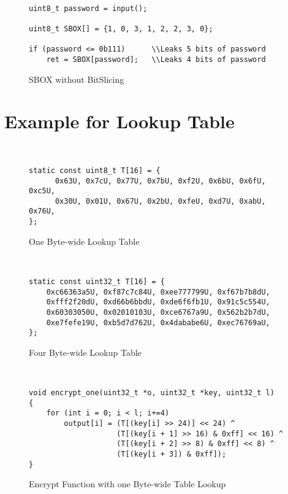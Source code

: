 ~

\begin{figure}[h!]
    \centering
    \begin{lstlisting}[xleftmargin=.02\textwidth,xrightmargin=.01\textwidth]
uint8_t password = input();

uint8_t SBOX[] = {1, 0, 3, 1, 2, 2, 3, 0};

if (password <= 0b111)      \\Leaks 5 bits of password
    ret = SBOX[password];   \\Leaks 4 bits of password
      \end{lstlisting}
    \caption{SBOX without BitSlicing}
    \label{fig:SBOX_da}
\end{figure}

\newpage

\section{Example for Lookup Table}
~
\begin{figure}[h!]
    \centering
    \begin{lstlisting}[xleftmargin=.02\textwidth,xrightmargin=.01\textwidth]
static const uint8_t T[16] = {
      0x63U, 0x7cU, 0x77U, 0x7bU, 0xf2U, 0x6bU, 0x6fU, 0xc5U,
      0x30U, 0x01U, 0x67U, 0x2bU, 0xfeU, 0xd7U, 0xabU, 0x76U,
};
      \end{lstlisting}
    \caption{One Byte-wide Lookup Table}
    \label{fig:one_byte_table}
\end{figure}
~
\begin{figure}[h!]
    \centering
    \begin{lstlisting}[xleftmargin=.02\textwidth,xrightmargin=.01\textwidth]
static const uint32_t T[16] = {
    0xc66363a5U, 0xf87c7c84U, 0xee777799U, 0xf67b7b8dU,
    0xfff2f20dU, 0xd66b6bbdU, 0xde6f6fb1U, 0x91c5c554U,
    0x60303050U, 0x02010103U, 0xce6767a9U, 0x562b2b7dU,
    0xe7fefe19U, 0xb5d7d762U, 0x4dababe6U, 0xec76769aU,
};
    \end{lstlisting}
    \caption{Four Byte-wide Lookup Table}
    \label{fig:four_byte_table}
\end{figure}

~

\begin{figure}[h!]
    \centering
    \begin{lstlisting}[xleftmargin=.02\textwidth,xrightmargin=.01\textwidth]
void encrypt_one(uint32_t *o, uint32_t *key, uint32_t l)
{
    for (int i = 0; i < l; i+=4)
        output[i] = (T[(key[i] >> 24)] << 24) ^
                    (T[(key[i + 1] >> 16) & 0xff] << 16) ^
                    (T[(key[i + 2] >> 8) & 0xff] << 8) ^
                    (T[(key[i + 3]) & 0xff]);
}
    \end{lstlisting}
    \caption{Encrypt Function with one Byte-wide Table Lookup}
    \label{fig:one_byte_table_lookup}
\end{figure}

